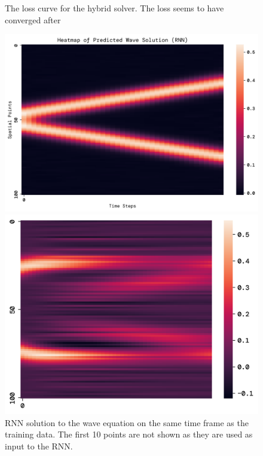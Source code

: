 \documentclass[twoside,11pt]{report}
\begin{document}
\begin{figure}[!ht]
\begin{minipage}[t]{0.5\textwidth - 1mm}
\begin{center}
            \end{center}
            \caption
            {
                The loss curve for the hybrid solver. The loss seems to have converged after  
            }\label{fig:wave_tf_dnn}
        \end{minipage}
    \end{figure}
    \begin{figure}[!ht]
        \begin{minipage}[t]{0.5\textwidth - 1mm}
            \begin{center}
                \includegraphics[width=\textwidth]{../runsAndFigures/wave_rnn.png}
            \end{center}
            \caption
            {
                RNN solution to the wave equation on the same time frame as the training data. 
                The first 10 points are not shown as they are used as input to the RNN.
            }\label{fig:wave_own_dnn}
        \end{minipage}
        \hspace{2mm}
        \begin{minipage}[t]{0.5\textwidth - 1mm}
            \begin{center}
                \includegraphics[width=\textwidth]{../runsAndFigures/wave_rnn_future.png}

\end{center}
\end{minipage}
\end{figure}
\end{document}
